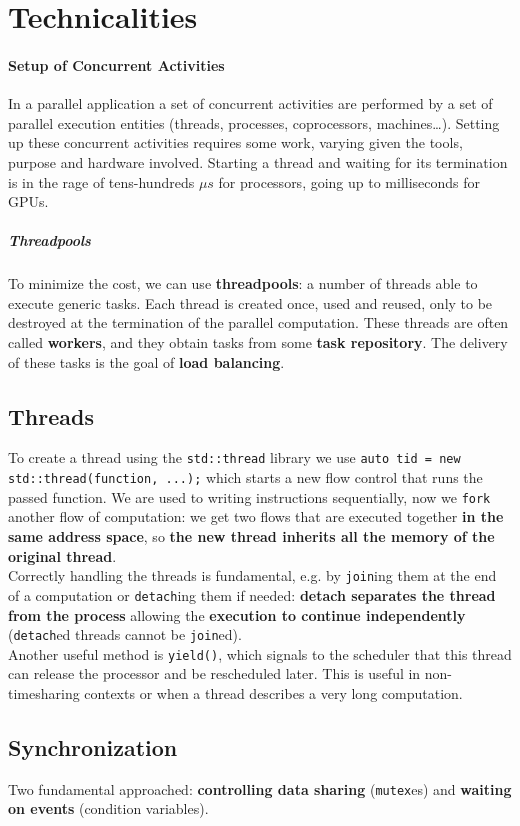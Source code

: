 \documentclass[10pt]{report}
\begin{document}
\section{Technicalities}
\paragraph{Setup of Concurrent Activities} In a parallel application a set of concurrent activities are performed by a set of parallel
execution entities (threads, processes, coprocessors, machines\ldots). Setting up these concurrent activities requires some work, varying given the tools, purpose and hardware involved. Starting a thread and waiting for its termination is in the rage of tens-hundreds $\mu s$ for processors, going up to milliseconds for GPUs.
\subparagraph{Threadpools} To minimize the cost, we can use \textbf{threadpools}: a number of threads able to execute generic tasks. Each thread is created once, used and reused, only to be destroyed at the termination of the parallel computation. These threads are often called \textbf{workers}, and they obtain tasks from some \textbf{task repository}. The delivery of these tasks is the goal of \textbf{load balancing}.
\subsection{Threads}
To create a thread using the \texttt{std::thread} library we use \texttt{auto tid = new std::thread(function, ...);} which starts a new flow control that runs the passed function. We are used to writing instructions sequentially, now we \texttt{fork} another flow of computation: we get two flows that are executed together \textbf{in the same address space}, so \textbf{the new thread inherits all the memory of the original thread}.\\
Correctly handling the threads is fundamental, e.g. by \texttt{join}ing them at the end of a computation or \texttt{detach}ing them if needed: \textbf{detach separates the thread from the process} allowing the \textbf{execution to continue independently} (\texttt{detach}ed threads cannot be \texttt{join}ed).\\
Another useful method is \texttt{yield()}, which signals to the scheduler that this thread can release the processor and be rescheduled later. This is useful in non-timesharing contexts or when a thread describes a very long computation.
\subsection{Synchronization}
Two fundamental approached: \textbf{controlling data sharing} (\texttt{mutex}es) and \textbf{waiting on events} (condition variables).
\end{document}
